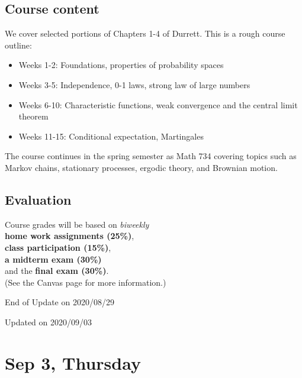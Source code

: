 \documentclass{article}
\begin{document}
        \subsection{Course content}
        We cover selected portions of Chapters 1-4 of Durrett. This is a rough course outline:
        \begin{itemize}
            \item Weeks 1-2: Foundations, properties of probability spaces
            \item Weeks 3-5: Independence, 0-1 laws, strong law of large numbers
            \item Weeks 6-10: Characteristic functions, weak convergence and the central limit theorem
            \item Weeks 11-15: Conditional expectation, Martingales
        \end{itemize}

        The course continues in the spring semester as Math 734 covering topics 
        such as Markov chains, stationary processes, ergodic theory, and Brownian motion.

        \subsection{Evaluation}
        Course grades will be based on \textit{biweekly} \\
        \indent \textbf{home work assignments (25\%)},\\
        \indent \textbf{class participation (15\%)},\\
        \indent \textbf{a midterm exam (30\%)}\\
        \indent and the \textbf{final exam (30\%)}.\\
        (See the Canvas page for more information.)
        
        \begin{center}
            \footnotesize End of Update on 2020/08/29
        \end{center}



\newpage
\begin{center}
    \footnotesize Updated on 2020/09/03
\end{center}

\section{Sep 3, Thursday}
\end{document}
